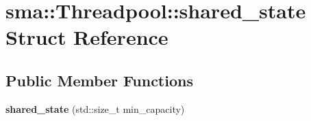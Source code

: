 \hypertarget{structsma_1_1Threadpool_1_1shared__state}{\section{sma\-:\-:Threadpool\-:\-:shared\-\_\-state Struct Reference}
\label{structsma_1_1Threadpool_1_1shared__state}
}
\subsection*{Public Member Functions}
\begin{DoxyCompactItemize}
\item 
\hypertarget{structsma_1_1Threadpool_1_1shared__state_aa5f5a3be0e352ebb558c77589a3ed475}{{\bfseries shared\-\_\-state} (std\-::size\-\_\-t min\-\_\-capacity)}\label{structsma_1_1Threadpool_1_1shared__state_aa5f5a3be0e352ebb558c77589a3ed475}

\end{DoxyCompactItemize}
